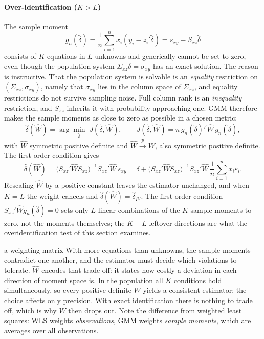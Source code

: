 \documentclass[11pt,a4paper]{article}
\newcommand{\cp}{\xrightarrow{\;p\;}}
\newcommand{\dhat}{\hat\delta}
\newcommand{\sxz}{\Sigma_{xz}}
\newcommand{\Sxz}{S_{xz}}
\begin{document}
\paragraph{Over-identification ($K>L$)}
The sample moment
\[
g_n(\tilde\delta)=\frac1n\sum_{i=1}^nx_i(y_i-z_i'\tilde\delta)=s_{xy}-\Sxz\tilde\delta
\]
consists of $K$ equations in $L$ unknowns and generically cannot be set to zero, even though the population system $\sxz\delta=\sigma_{xy}$ has an exact solution. The reason is instructive. That the population system is solvable is an \emph{equality} restriction on $(\sxz,\sigma_{xy})$, namely that $\sigma_{xy}$ lies in the column space of $\sxz$, and equality restrictions do not survive sampling noise. Full column rank is an \emph{inequality} restriction, and $\Sxz$ inherits it with probability approaching one. GMM therefore makes the sample moments as close to zero as possible in a chosen metric:
\[
\dhat(\hat W)=\arg\min_{\tilde\delta}\;J(\tilde\delta,\hat W),\qquad J(\tilde\delta,\hat W)=n\,g_n(\tilde\delta)'\,\hat W\,g_n(\tilde\delta),
\]
with $\hat W$ symmetric positive definite and $\hat W\cp W$, also symmetric positive definite. The first-order condition gives
\begin{equation}\label{eq:gmm}
\dhat(\hat W)=\big(\Sxz'\hat W\Sxz\big)^{-1}\Sxz'\hat W\,s_{xy}=\delta+\big(\Sxz'\hat W\Sxz\big)^{-1}\Sxz'\hat W\,\frac1n\sum_{i=1}^nx_i\varepsilon_i .
\end{equation}
Rescaling $\hat W$ by a positive constant leaves the estimator unchanged, and when $K=L$ the weight cancels and $\dhat(\hat W)=\dhat_{IV}$. The first-order condition $\Sxz'\hat Wg_n(\dhat)=0$ sets only $L$ linear combinations of the $K$ sample moments to zero, not the moments themselves; the $K-L$ leftover directions are what the overidentification test of this section examines.

\begin{whybox}{a weighting matrix}
With more equations than unknowns, the sample moments contradict one another, and the estimator must decide which violations to tolerate. $\hat W$ encodes that trade-off: it states how costly a deviation in each direction of moment space is. In the population all $K$ conditions hold simultaneously, so every positive definite $W$ yields a consistent estimator; the choice affects only precision. With exact identification there is nothing to trade off, which is why $W$ then drops out. Note the difference from weighted least squares: WLS weights \emph{observations}, GMM weights \emph{sample moments}, which are averages over all observations.
\end{whybox}
\end{document}
